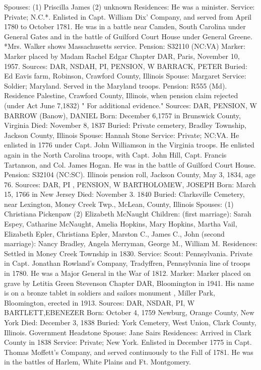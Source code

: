Spouses: (1) Priscilla James 
    (2) unknown Residences: He was a minister. 
Service: Private; N.C.*. Enlisted in Capt. William Dix' Company, and served from April 1780 to October 1781. He was in a battle near Camden, South Carolina under General Gates and in the battle of Guilford Court House under General Greene. 
*Mrs. Walker shows Massachusetts service. 
Pension: S32110 (NC:VA) 
Marker: Marker placed by Madam Rachel Edgar Chapter DAR, Paris, November 10, 1957. 
Sources: DAR, NSDAH, PI, PENSION, W 
BARRACK, PETER 
Buried: Ed Eavis farm, Robinson, Crawford County, Illinois 
Spouse: Margaret 
Service: Soldier; Maryland. Served in the Maryland troops. 
Pension: R555 (Md). 
Residence Palestine, Crawford County, Illinois, when pen­sion claim rejected (under Act June 7,1832) " For additional evidence." 
Sources: DAR, PENSION, W 
BARROW (Banow), DANIEL 
Born: December 6,1757 in Brunswick County, Virginia 
Died: November 8, 1837 
Buried: Private cemetery, Bradley Township, Jackson County, Illinois 
Spouse: Hannah Stone 
Service: Private; NC:VA. He enlisted in 1776 under Capt. John Williamson in the Virginia troops. He enlisted again in the North Carolina troops, with Capt. John Hill, Capt. Francis Tartanson, and Col. James Hogan. He was in the battle of Guilford Court House. 
Pension: S32104 (NC:SC). Illinois pension roll, Jackson County, May 3, 1834, age 76. 
Sources: DAR, PI , PENSION, W 
BARTHOLOMEW, JOSEPH 
Born: March 15, 1766 in New Jersey 
Died: November 3. 1840 
Buried: Clarksville Cemetery, near Lexington, Money Creek Twp., McLean, County, Illinois 
Spouses: (1) Christiana Pickenpaw 
    (2) Elizabeth McNaught 
Children: (first marriage): Sarah Espey, Catharine McNaught, Amelia Hopkins, Mary Hopkins, Martha Vail, Elizabeth Epler, Christiana Epler, Marston C., James C., John (second marriage): Nancy Bradley, Angela Merryman, George M., William M. 
Residences: Settled in Money Creek Township in 1830. 
Service: Scout: Pennsylvania. Private in Capt. Jonathan Rowland's Company, Tradyffren, Pennsylvania line of troops in 1780. He was a Major General in the War of 1812. 
Marker: Marker placed on grave by Letitia Green Stevenson Chapter DAR, Bloomington in 1941. His name is on a bronze tablet in soldiers and sailors monument , Miller Park, Bloomington, erected in 1913. 
Sources: DAR, NSDAR, PI, W 
BARTLETT,EBENEZER 
Born: October 4, 1759 Newburg, Orange County, New York 
Died: December 3, 1838 
Buried: York Cemetery, West Union, Clark County, Illinois. Government Head­stone 
Spouse: Jane Sairs 
Residences: Arrived in Clark County in 1838 
Service: Private; New York. Enlisted in December 1775 in Capt. Thomas Moffett's Company, and served continuously to the Fall of 1781. He was in the battles of Harlem, White Plains and Ft. Montgomery. 

